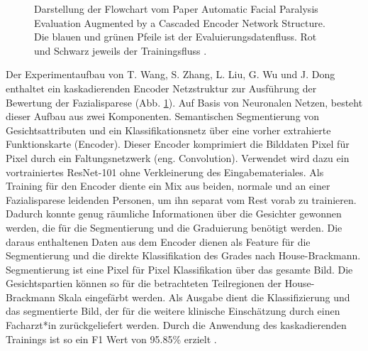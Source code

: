 \begin{figure}[!b]
{
}%
\caption[Darstellung der Flowchart vom Paper Automatic Facial Paralysis Evaluation Augmented by a Cascaded Encoder Network Structure.]{Darstellung der Flowchart vom Paper Automatic Facial Paralysis Evaluation Augmented by a Cascaded Encoder Network Structure. Die blauen und grünen Pfeile ist der Evaluierungsdatenfluss. Rot und Schwarz jeweils der Trainingsfluss \cite{detection_fp2}.}\label{cap:paper_1}
\end{figure}\label{fig:paper_1}

Der Experimentaufbau von T. Wang, S. Zhang, L. Liu, G. Wu und J. Dong enthaltet ein kaskadierenden Encoder Netzstruktur zur Ausführung der Bewertung der Fazialisparese (Abb. \ref{cap:paper_1}). Auf Basis von Neuronalen Netzen, besteht dieser Aufbau aus zwei Komponenten. Semantischen Segmentierung von Gesichtsattributen und ein Klassifikationsnetz über eine vorher extrahierte Funktionskarte (Encoder). Dieser Encoder komprimiert die Bilddaten Pixel für Pixel durch ein Faltungsnetzwerk (eng. Convolution). Verwendet wird dazu ein vortrainiertes ResNet-101 ohne Verkleinerung des Eingabemateriales. Als Training für den Encoder diente ein Mix aus beiden, normale und an einer Fazialisparese leidenden Personen, um ihn separat vom Rest vorab zu trainieren. Dadurch konnte genug räumliche Informationen über die Gesichter gewonnen werden, die für die Segmentierung und die Graduierung benötigt werden. Die daraus enthaltenen Daten aus dem Encoder dienen als Feature für die Segmentierung und die direkte Klassifikation des Grades nach House-Brackmann. Segmentierung ist eine Pixel für Pixel Klassifikation über das gesamte Bild. Die Gesichtspartien können so für die betrachteten Teilregionen der House-Brackmann Skala eingefärbt werden. Als Ausgabe dient die Klassifizierung und das segmentierte Bild, der für die weitere klinische Einschätzung durch einen Facharzt*in zurückgeliefert werden. Durch die Anwendung des kaskadierenden Trainings ist so ein F1 Wert von 95.85\% erzielt \cite{detection_fp2}.



